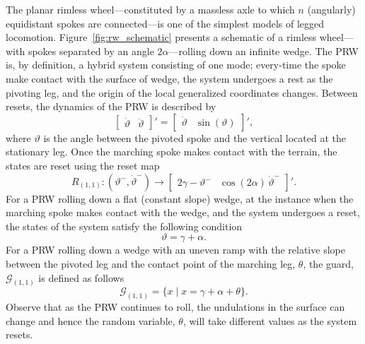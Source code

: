 \begin{example}
\label{example:rw}
  The planar rimless wheel---constituted by a massless axle to which $n$ (angularly) equidistant spokes are connected---is one of the simplest models of legged locomotion. Figure~\ref{fig:rw_schematic} presents a schematic of a rimless wheel---with spokes separated by an angle $2\alpha$---rolling down an infinite wedge. The PRW is, by definition, a hybrid system consisting of one mode; every-time the spoke make contact with the surface of wedge, the system undergoes a rest as the pivoting leg, and the origin of the local generalized coordinates changes. Between resets, the dynamics of the PRW is described by
$$
  \begin{bmatrix}
    \dot \vartheta& \ddot\vartheta
  \end{bmatrix}'=\begin{bmatrix}
    \dot\vartheta&\sin(\vartheta)
  \end{bmatrix}',
$$
where $\vartheta$ is the angle between the pivoted spoke and the vertical located at the stationary leg. Once the marching spoke makes contact with the terrain, the states are reset using the reset map
$$
R_{(1,1)}\colon (\vartheta^-,\dot \vartheta^-)\rightarrow\begin{bmatrix}
    2\gamma-\vartheta^-&
    \cos(2\alpha)\,\dot\vartheta^-
  \end{bmatrix}'.
$$
For a PRW rolling down a flat (constant slope) wedge, at the instance when the marching spoke makes contact with the wedge, and the system undergoes a reset, the states of the system satisfy the following condition
$$\vartheta = \gamma+\alpha.$$
For a PRW rolling down a wedge with an uneven ramp with the relative slope between the pivoted leg and the contact point of the marching leg, $\theta$, the guard, $\mathcal G_{(1,1)}$ is defined as follows
$$\mathcal G_{(1,1)}=\{x\mid x=\gamma+\alpha+\theta\}.$$
Observe that as the PRW continues to roll, the undulations in the surface can change and hence the random variable, $\theta$, will take different values as the system resets.
\end{example}
